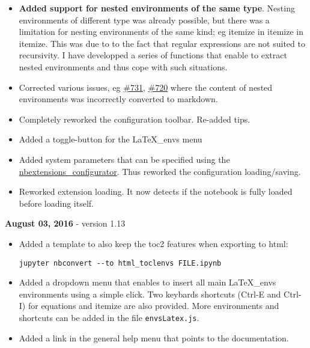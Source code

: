 \begin{itemize}
\item
  \textbf{Added support for nested environments of the same type}.
  Nesting environments of different type was already possible, but there
  was a limitation for nesting environments of the same kind; eg itemize
  in itemize in itemize. This was due to to the fact that regular
  expressions are not suited to recursivity. I have developped a series
  of functions that enable to extract nested environments and thus cope
  with such situations.
\item
  Corrected various issues, eg
  \href{https://github.com/ipython-contrib/jupyter_contrib_nbextensions/issues/731}{\#731},
  \href{https://github.com/ipython-contrib/jupyter_contrib_nbextensions/issues/720}{\#720}
  where the content of nested environments was incorrectly converted to
  markdown.
\item
  Completely reworked the configuration toolbar. Re-added tips.
\item
  Added a toggle-button for the LaTeX\_envs menu
\item
  Added system parameters that can be specified using the
  \href{https://github.com/Jupyter-contrib/jupyter_nbextensions_configurator/tree/master/src/jupyter_nbextensions_configurator/static/nbextensions_configurator}{nbextensions\_configurator}.
  Thus reworked the configuration loading/saving.
\item
  Reworked extension loading. It now detects if the notebook is fully
  loaded before loading itself.
\end{itemize}

\textbf{August 03, 2016} - version 1.13

\begin{itemize}
\item
  Added a template to also keep the toc2 features when exporting to
  html:

\begin{verbatim}
jupyter nbconvert --to html_toclenvs FILE.ipynb
\end{verbatim}
\item
  Added a dropdown menu that enables to insert all main LaTeX\_envs
  environments using a simple click. Two keybards shortcuts (Ctrl-E and
  Ctrl-I) for equations and itemize are also provided. More environments
  and shortcuts can be added in the file \texttt{envsLatex.js}.
\item
  Added a link in the general help menu that points to the
  documentation.
\end{itemize}

